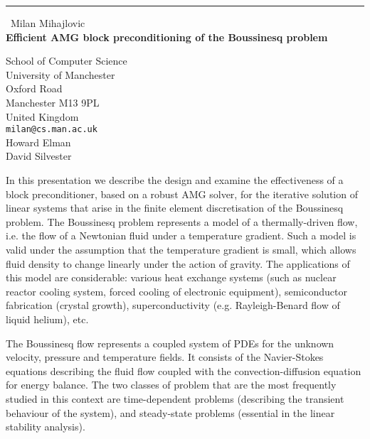 \documentclass{report}
\begin{document}
\begin{center}
\rule{6in}{1pt} \
{\large Milan Mihajlovic \\
{\bf Efficient AMG block preconditioning of the Boussinesq problem}}

School of Computer Science \\ University of Manchester \\ Oxford Road \\ Manchester M13 9PL \\ United Kingdom
\\
{\tt milan@cs.man.ac.uk}\\
Howard Elman\\
David Silvester\end{center}

In this presentation we describe the design and examine the effectiveness
of a block preconditioner, based on a robust AMG solver, for the
iterative solution of linear systems that arise in the finite element
discretisation of the Boussinesq problem. The Boussinesq problem
represents a model of a thermally-driven flow, i.e. the flow of a
Newtonian fluid under a temperature
gradient. Such a model is valid under the assumption that the temperature
gradient is small, which allows fluid density to change linearly under
the action of gravity. The applications of this model are considerable:
various heat exchange systems (such as nuclear reactor cooling system,
forced cooling of
electronic equipment), semiconductor fabrication (crystal growth),
superconductivity (e.g. Rayleigh-Benard flow of liquid helium), etc.

The Boussinesq flow represents a coupled system of PDEs for the unknown
velocity, pressure and temperature fields. It consists of the
Navier-Stokes equations describing the fluid flow coupled with the
convection-diffusion equation for energy balance. The two classes of
problem that are the most frequently studied in this context are
time-dependent problems (describing the
transient behaviour of the system), and steady-state problems (essential
in the linear stability analysis).
\end{document}
